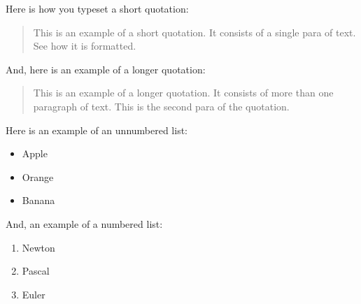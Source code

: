 \documentclass {article}
\begin{document}
Here is how you typeset a short quotation:
\begin{quote}
This is an example of a short quotation. It consists of a single
para of text. See how it is formatted.
\end{quote}

And, here is an example of a longer quotation:

\begin{quotation}
This is an example of a longer quotation. It consists of more
than one paragraph of text.
This is the second para of the quotation.
\end{quotation}

Here is an example of an unnumbered list:
\begin{itemize}
\item Apple
\item Orange
\item Banana
\end{itemize}

And, an example of a numbered list:
\begin{enumerate}
\item Newton
\item Pascal
\item Euler
\end{enumerate}
\end{document}
